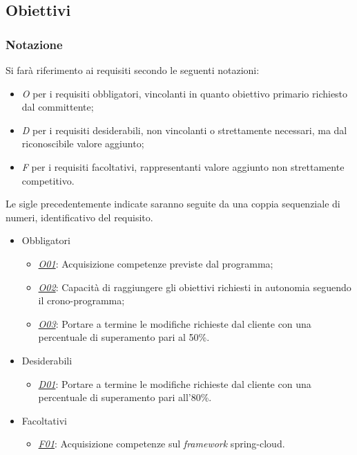 \subsection{Obiettivi}

\subsubsection*{Notazione}
Si farà riferimento ai requisiti secondo le seguenti notazioni:
\begin{itemize}
	\item \textit{O} per i requisiti obbligatori, vincolanti in quanto obiettivo primario richiesto dal committente;
	\item \textit{D} per i requisiti desiderabili, non vincolanti o strettamente necessari,
	ma dal riconoscibile valore aggiunto;
	\item \textit{F} per i requisiti facoltativi, rappresentanti valore aggiunto non strettamente 
	competitivo.
\end{itemize}

Le sigle precedentemente indicate saranno seguite da una coppia sequenziale di numeri, identificativo del requisito.

\begin{itemize}[noitemsep]
	\item Obbligatori
	\begin{itemize}
		\item \underline{\textit{O01}}: Acquisizione competenze previste dal programma;
		\item \underline{\textit{O02}}: Capacità di raggiungere gli obiettivi richiesti in autonomia seguendo il crono-programma;
		\item \underline{\textit{O03}}: Portare a termine le modifiche richieste dal cliente con una percentuale di superamento pari al 50\%.
	\end{itemize}
	\item Desiderabili
	\begin{itemize}
		\item \underline{\textit{D01}}: Portare a termine le modifiche richieste dal cliente con una percentuale di superamento pari all'80\%.
	\end{itemize}
	\item Facoltativi
	\begin{itemize}
		\item \underline{\textit{F01}}: Acquisizione competenze sul \textit{framework} \gls{spring-cloud}\gloss.
	\end{itemize}
\end{itemize}

